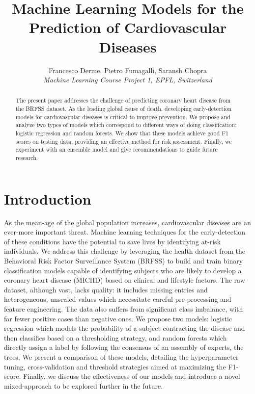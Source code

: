\documentclass[10pt,conference,compsocconf]{IEEEtran}
\begin{document}
\title{Machine Learning Models for the Prediction of Cardiovascular Diseases}

\author{
   Francesco Derme, Pietro Fumagalli, Saransh Chopra\\
  \textit{Machine Learning Course Project 1, EPFL, Switzerland}
}

\maketitle

\begin{abstract}
The present paper addresses the challenge of predicting coronary heart disease from the BRFSS dataset. As the leading global cause of death, developing early-detection models for cardiovascular diseases is critical to improve prevention. We propose and analyze two types of models which correspond to different ways of doing classification: logistic regression and random forests. We show that these models achieve good F1 scores on testing data, providing an effective method for risk assessment. Finally, we experiment with an ensemble model and give recommendations to guide future research.
\end{abstract}

\section{Introduction}
As the mean-age of the global population increases, cardiovascular diseases are an ever-more important threat. Machine learning techniques for the early-detection of these conditions have the potential to save lives by identifying at-risk individuals. We address this challenge by leveraging the health dataset from the Behavioral Risk Factor Surveillance System (BRFSS) \cite{cdc} to build and train binary classification models capable of identifying subjects who are likely to develop a coronary heart disease (MICHD) based on clinical and lifestyle factors. The raw dataset, although vast, lacks quality: it includes missing entries and heterogeneous, unscaled values which necessitate careful pre-processing and feature engineering. The data also suffers from significant class imbalance, with far fewer positive cases than negative ones. We propose two models: logistic regression which models the probability of a subject contracting the disease and then classifies based on a thresholding strategy, and random forests which directly assign a label by following the consensus of an assembly of experts, the trees. We present a comparison of these models, detailing the hyperparameter tuning, cross-validation and threshold strategies aimed at maximizing the F1-score. Finally, we discuss the effectiveness of our models and introduce a novel mixed-approach to be explored further in the future.
\end{document}
